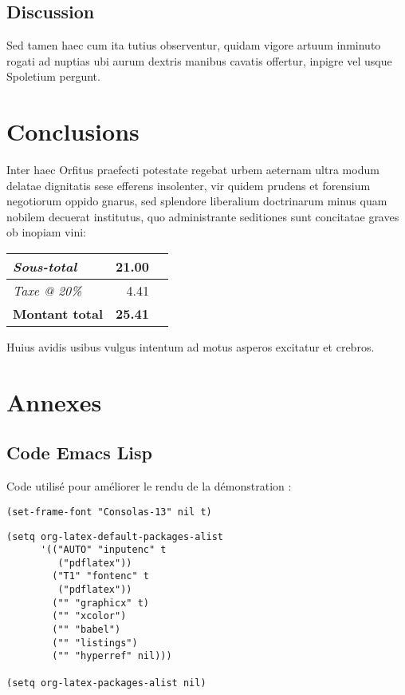 \documentclass[french]{report}
\begin{document}
\section{Discussion}
\label{sec:org62a71aa}

Sed tamen haec cum ita tutius observentur, quidam vigore artuum inminuto rogati
ad nuptias ubi aurum dextris manibus cavatis offertur, inpigre vel usque
Spoletium pergunt.

\chapter{Conclusions}
\label{sec:org5f7f7ca}

Inter haec Orfitus praefecti potestate regebat urbem aeternam ultra modum
delatae dignitatis sese efferens insolenter, vir quidem prudens et forensium
negotiorum oppido gnarus, sed splendore liberalium doctrinarum minus quam
nobilem decuerat institutus, quo administrante seditiones sunt concitatae graves
ob inopiam vini:

\begin{center}
\begin{tabular}{lrl}
\emph{Sous-total} & 21.00 & \texteuro{}\\
\hline
\emph{Taxe @ 20\%} & 4.41 & \texteuro{}\\
\hline
\textbf{Montant total} & \textbf{\large 25.41} & \textbf{\texteuro{}}\\
\end{tabular}
\end{center}

Huius avidis usibus vulgus intentum ad motus asperos excitatur et crebros.

\chapter{Annexes}
\label{sec:org5798e24}

\section{Code Emacs Lisp}
\label{sec:org0318d1c}

Code utilisé pour améliorer le rendu de la démonstration :

\lstset{language=Lisp,label= ,caption= ,captionpos=b,numbers=none}
\begin{lstlisting}
(set-frame-font "Consolas-13" nil t)
\end{lstlisting}

\lstset{language=Lisp,label= ,caption= ,captionpos=b,numbers=none}
\begin{lstlisting}
(setq org-latex-default-packages-alist
      '(("AUTO" "inputenc" t
         ("pdflatex"))
        ("T1" "fontenc" t
         ("pdflatex"))
        ("" "graphicx" t)
        ("" "xcolor")
        ("" "babel")
        ("" "listings")
        ("" "hyperref" nil)))

(setq org-latex-packages-alist nil)
\end{lstlisting}
\end{document}

